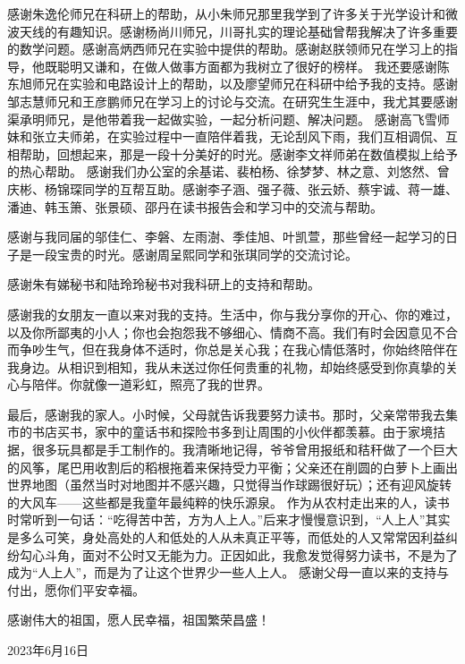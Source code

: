 \begin{acknowledgements}
感谢朱逸伦师兄在科研上的帮助，从小朱师兄那里我学到了许多关于光学设计和微波天线的有趣知识。感谢杨尚川师兄，川哥扎实的理论基础曾帮我解决了许多重要的数学问题。感谢高炳西师兄在实验中提供的帮助。感谢赵朕领师兄在学习上的指导，他既聪明又谦和，在做人做事方面都为我树立了很好的榜样。
我还要感谢陈东旭师兄在实验和电路设计上的帮助，以及廖望师兄在科研中给予我的支持。感谢邹志慧师兄和王彦鹏师兄在学习上的讨论与交流。在研究生生涯中，我尤其要感谢渠承明师兄，是他带着我一起做实验，一起分析问题、解决问题。
感谢高飞雪师妹和张立夫师弟，在实验过程中一直陪伴着我，无论刮风下雨，我们互相调侃、互相帮助，回想起来，那是一段十分美好的时光。感谢李文祥师弟在数值模拟上给予的热心帮助。
感谢我们办公室的余基诺、裴柏杨、徐梦梦、林之意、刘悠然、曾庆彬、杨锦琛同学的互帮互助。感谢李子涵、强子薇、张云娇、蔡宇诚、蒋一雄、潘迪、韩玉箫、张景硕、邵丹在读书报告会和学习中的交流与帮助。

感谢与我同届的邬佳仁、李磐、左雨澍、季佳旭、叶凯萱，那些曾经一起学习的日子是一段宝贵的时光。感谢周呈熙同学和张琪同学的交流讨论。

感谢朱有娣秘书和陆玲玲秘书对我科研上的支持和帮助。


感谢我的女朋友一直以来对我的支持。生活中，你与我分享你的开心、你的难过，以及你所鄙夷的小人；你也会抱怨我不够细心、情商不高。我们有时会因意见不合而争吵生气，但在我身体不适时，你总是关心我；在我心情低落时，你始终陪伴在我身边。从相识到相知，我从未送过你任何贵重的礼物，却始终感受到你真挚的关心与陪伴。你就像一道彩虹，照亮了我的世界。

最后，感谢我的家人。小时候，父母就告诉我要努力读书。那时，父亲常带我去集市的书店买书，家中的童话书和探险书多到让周围的小伙伴都羡慕。由于家境拮据，很多玩具都是手工制作的。我清晰地记得，爷爷曾用报纸和秸秆做了一个巨大的风筝，尾巴用收割后的稻根拖着来保持受力平衡；父亲还在削圆的白萝卜上画出世界地图（虽然当时对地图并不感兴趣，只觉得当作球踢很好玩）；还有迎风旋转的大风车——这些都是我童年最纯粹的快乐源泉。
作为从农村走出来的人，读书时常听到一句话：“吃得苦中苦，方为人上人。”后来才慢慢意识到，“人上人”其实是多么可笑，身处高处的人和低处的人从未真正平等，而低处的人又常常因利益纠纷勾心斗角，面对不公时又无能为力。正因如此，我愈发觉得努力读书，不是为了成为“人上人”，而是为了让这个世界少一些人上人。
感谢父母一直以来的支持与付出，愿你们平安幸福。

感谢伟大的祖国，愿人民幸福，祖国繁荣昌盛！

\hfill 2023年6月16日

\end{acknowledgements}

























